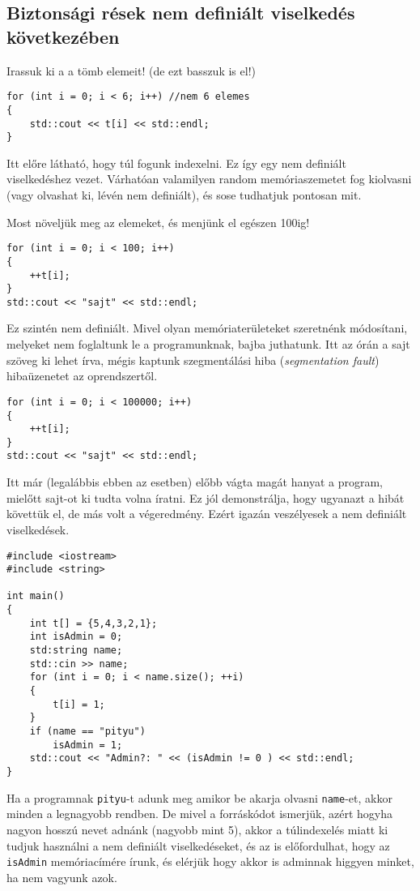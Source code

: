 \documentclass[a4paper,11.5pt,table]{article}
\begin{document}
		\subsection{Biztonsági rések nem definiált viselkedés következében}
		Irassuk ki a a tömb elemeit! (de ezt basszuk is el!)
		\begin{lstlisting}
for (int i = 0; i < 6; i++) //nem 6 elemes
{
	std::cout << t[i] << std::endl;
}
		\end{lstlisting} 
		Itt előre látható, hogy túl fogunk indexelni. Ez így egy {nem definiált viselkedés}hez vezet. Várhatóan valamilyen random memóriaszemetet fog kiolvasni (vagy olvashat ki, lévén nem definiált), és sose tudhatjuk pontosan mit.
		
		Most növeljük meg az elemeket, és menjünk el egészen 100ig!
		\begin{lstlisting}
for (int i = 0; i < 100; i++)
{
	++t[i];
}
std::cout << "sajt" << std::endl;
		\end{lstlisting} 
		Ez szintén nem definiált. Mivel olyan memóriaterületeket szeretnénk módosítani, melyeket nem foglaltunk le a programunknak, bajba juthatunk. Itt az órán a {sajt} szöveg ki lehet írva, mégis kaptunk szegmentálási hiba (\textit{segmentation fault}) hibaüzenetet az oprendszertől.
		
		\begin{lstlisting}
for (int i = 0; i < 100000; i++)
{
	++t[i];
}
std::cout << "sajt" << std::endl;
		\end{lstlisting} 
		Itt már (legalábbis ebben az esetben) előbb vágta magát hanyat a program, mielőtt sajt-ot ki tudta volna íratni. Ez jól demonstrálja, hogy ugyanazt  a hibát követtük el, de más volt a végeredmény. Ezért igazán veszélyesek a nem definiált viselkedések.
		\begin{lstlisting}
#include <iostream>
#include <string>

int main()
{
	int t[] = {5,4,3,2,1};
	int isAdmin = 0;
	std:string name;
	std::cin >> name;
	for (int i = 0; i < name.size(); ++i)
	{
		t[i] = 1;
	}
	if (name == "pityu")
		isAdmin = 1;
	std::cout << "Admin?: " << (isAdmin != 0 ) << std::endl;
}
		\end{lstlisting}
		Ha a programnak \texttt{pityu}-t adunk meg amikor be akarja olvasni \texttt{name}-et, akkor minden a legnagyobb rendben. De mivel a forráskódot ismerjük, azért hogyha nagyon hosszú nevet adnánk (nagyobb mint 5), akkor a túlindexelés miatt ki tudjuk használni a nem definiált viselkedéseket, és az is előfordulhat, hogy az \texttt{isAdmin} memóriacímére írunk, és elérjük hogy akkor is adminnak higgyen minket, ha nem vagyunk azok.
		\medskip
		
\end{document}
